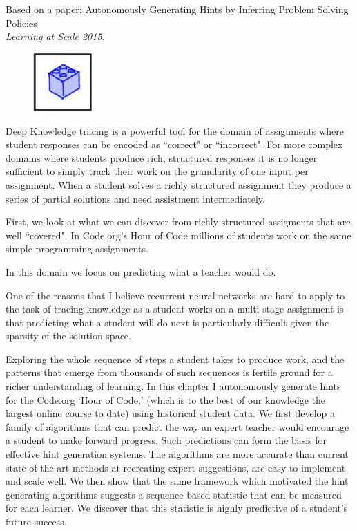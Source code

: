 Based on a paper: Autonomously Generating Hints by Inferring Problem
Solving Policies \\ \emph{Learning at Scale 2015.}

\vspace{7mm}

\begin{figure}[h!]
\includegraphics[width=0.2\textwidth]{img/assnType_2}
\end{figure}

\vspace{7mm}

Deep Knowledge tracing is a powerful tool for the domain of assignments where student responses can be encoded as ``correct" or ``incorrect". For more complex domains where students produce rich, structured responses it is no longer sufficient to simply track their work on the granularity of one input per assignment. When a student solves a richly structured assignment they produce a series of partial solutions and need assistment intermediately.

First, we look at what we can discover from richly structured assigments that are well ``covered". In Code.org's Hour of Code millions of students work on the same simple programming assignments. 

In this domain we focus on predicting what a teacher would do.

One of the reasons that I believe recurrent neural networks are hard to apply to the task of tracing knowledge as a student works on a multi stage assignment is that predicting what a student will do next is particularly difficult given the sparsity of the solution space.

Exploring the whole sequence of steps a student takes to produce work, and the patterns that emerge from thousands of such sequences is fertile ground for a richer understanding of learning. In this chapter I autonomously generate hints for the Code.org `Hour of Code,' (which is to the best of our knowledge the largest online course to date) using historical student data. We first develop a family of algorithms that can predict the way an expert teacher would encourage a student to make forward progress. Such predictions can form the basis for effective hint generation systems. The algorithms are more accurate than current state-of-the-art methods at recreating expert suggestions, are easy to implement and scale well. We then show that the same framework which motivated the hint generating algorithms suggests a sequence-based statistic that can be measured for each learner. We discover that this statistic is highly predictive of a student's future success. 


